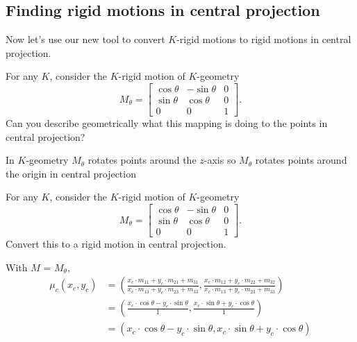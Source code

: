 \documentclass[newpage,hints,handout,12pt,nooutcomes,noauthor]{ximera}
\begin{document}
\subsection{Finding rigid motions in central projection}

Now let's use our new tool to convert $K$-rigid motions to rigid motions in central projection. 



\begin{problem}
  For any $K$, consider the $K$-rigid motion of $K$-geometry
  \[
  M_\theta=
  \begin{bmatrix}
    \cos\theta & -\sin\theta & 0\\
    \sin\theta & \cos\theta & 0\\
    0 & 0 & 1
  \end{bmatrix}.
  \]
  Can you describe geometrically what this mapping is doing to the
  points in central projection?
  
  \begin{freeResponse}
  In $K$-geometry $M_\theta$ rotates points around the $z$-axis so $M_\theta$ rotates points around the origin in central projection
  \end{freeResponse}
\end{problem}


\begin{problem}
  For any $K$, consider the $K$-rigid motion of $K$-geometry
  \[
  M_\theta=
  \begin{bmatrix}
    \cos\theta & -\sin\theta & 0\\
    \sin\theta & \cos\theta & 0\\
    0 & 0 & 1
  \end{bmatrix}.
  \]
  Convert this to a rigid motion in central projection.
  \begin{freeResponse}
   With $M$ = $M_\theta$,
  \begin{align*}
  \mu_c(x_c,y_c) &= \left( \frac{x_c\cdot m_{11} + y_c\cdot m_{21} + m_{31}}{x_c\cdot m_{13} + y_c\cdot m_{23} + m_{33}},
    \frac{x_c\cdot m_{12} + y_c\cdot m_{22} + m_{32}}{x_c\cdot m_{13} + y_c\cdot m_{23} + m_{33}} \right) \\
    &= \left( \frac{x_c\cdot \cos\theta - y_c\cdot \sin\theta}{1},
    \frac{x_c\cdot \sin\theta + y_c \cdot \cos\theta}{1} \right) \\
    &= \left( x_c\cdot \cos\theta - y_c\cdot \sin\theta,
    x_c\cdot \sin\theta+ y_c \cdot \cos\theta \right)
  \end{align*}
  \end{freeResponse}
\end{problem}
\end{document}
